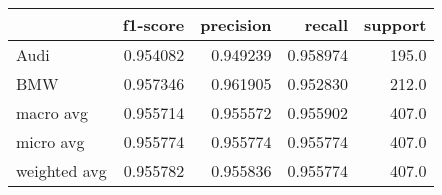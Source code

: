 \begin{tabular}{lrrrr}
\toprule
{} &  f1-score &  precision &    recall &  support \\
\midrule
Audi         &  0.954082 &   0.949239 &  0.958974 &    195.0 \\
BMW          &  0.957346 &   0.961905 &  0.952830 &    212.0 \\
macro avg    &  0.955714 &   0.955572 &  0.955902 &    407.0 \\
micro avg    &  0.955774 &   0.955774 &  0.955774 &    407.0 \\
weighted avg &  0.955782 &   0.955836 &  0.955774 &    407.0 \\
\bottomrule
\end{tabular}
